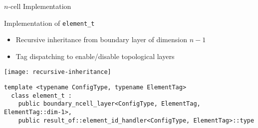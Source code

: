 \begin{frame}[fragile]{$n$-cell Implementation}

 \begin{block}{Implementation of \lstinline|element_t|}
  \begin{itemize}
   \item Recursive inheritance from boundary layer of dimension $n-1$
   \item Tag dispatching to enable/disable topological layers
  \end{itemize}
  \vspace*{-0.2cm}
  \begin{center}
    \texttt{[image: recursive-inheritance]}
  \end{center}
 \end{block}

 \begin{lstlisting}[basicstyle=\scriptsize\ttfamily]
  template <typename ConfigType, typename ElementTag>
  class element_t :
    public boundary_ncell_layer<ConfigType, ElementTag, ElementTag::dim-1>,
    public result_of::element_id_handler<ConfigType, ElementTag>::type
 \end{lstlisting}
 \vspace*{0.3cm}
\end{frame}

